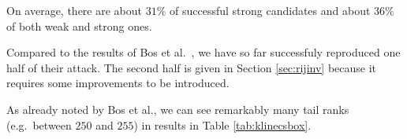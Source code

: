	On average, there are about $31\%$ of successful strong candidates and about $36\%$ of both weak and strong ones.
	
	Compared to the results of Bos et al.\ \cite{bos2015differential}, we have so far successfuly reproduced one half of their attack. The second half is given in Section \ref{sec:rijinv} because it requires some improvements to be introduced.
	
	\begin{note}
	\label{note:tailrank}
		As already noted by Bos et al., we can see remarkably many tail ranks (e.g.\ between $250$ and $255$) in results in Table \ref{tab:klinecsbox}.
	\end{note}




